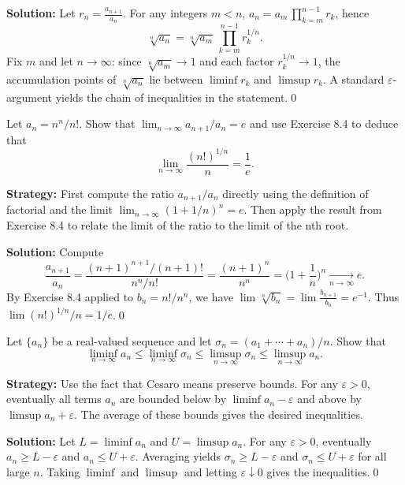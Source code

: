 \bigskip\noindent\textbf{Solution:}
Let \(r_n=\frac{a_{n+1}}{a_n}\). For any integers \(m<n\), \(a_n=a_m\,\prod_{k=m}^{n-1} r_k\), hence
\[\sqrt[n]{a_n}=\sqrt[n]{a_m}\, \prod_{k=m}^{n-1} r_k^{1/n}.\]
Fix \(m\) and let \(n\to\infty\): since \(\sqrt[n]{a_m}\to 1\) and each factor \(r_k^{1/n}\to 1\), the accumulation points of \(\sqrt[n]{a_n}\) lie between \(\liminf r_k\) and \(\limsup r_k\). A standard \(\varepsilon\)-argument yields the chain of inequalities in the statement.\qed


\begin{problembox}
\begin{problemstatement}
Let \(a_n = n^n / n!\). Show that \(\lim_{n \to \infty} a_{n+1} / a_n = e\) and use Exercise 8.4 to deduce that
\[\lim_{n \to \infty} \frac{(n!)^{1/n}}{n} = \frac{1}{e}.\]
\end{problemstatement}
\end{problembox}

\noindent\textbf{Strategy:} First compute the ratio \(a_{n+1}/a_n\) directly using the definition of factorial and the limit \(\lim_{n\to\infty}(1+1/n)^n=e\). Then apply the result from Exercise 8.4 to relate the limit of the ratio to the limit of the nth root.

\bigskip\noindent\textbf{Solution:}
Compute
\[\frac{a_{n+1}}{a_n}=\frac{(n+1)^{n+1}/(n+1)!}{n^n/n!}=\frac{(n+1)^n}{n^n}=\Big(1+\frac{1}{n}\Big)^n\xrightarrow[n\to\infty]{} e.\]
By Exercise 8.4 applied to \(b_n=n!/n^n\), we have \(\lim \sqrt[n]{b_n}=\lim \frac{b_{n+1}}{b_n}=e^{-1}\). Thus \(\lim (n!)^{1/n}/n=1/e\).\qed


\begin{problembox}
\begin{problemstatement}
Let \(\{a_n\}\) be a real-valued sequence and let \(\sigma_n = (a_1 + \cdots + a_n)/n\). Show that
\[\liminf_{n \to \infty} a_n \leq \liminf_{n \to \infty} \sigma_n \leq \limsup_{n \to \infty} \sigma_n \leq \limsup_{n \to \infty} a_n.\]
\end{problemstatement}
\end{problembox}

\noindent\textbf{Strategy:} Use the fact that Cesaro means preserve bounds. For any \(\varepsilon>0\), eventually all terms \(a_n\) are bounded below by \(\liminf a_n-\varepsilon\) and above by \(\limsup a_n+\varepsilon\). The average of these bounds gives the desired inequalities.

\bigskip\noindent\textbf{Solution:}
Let \(L=\liminf a_n\) and \(U=\limsup a_n\). For any \(\varepsilon>0\), eventually \(a_n\ge L-\varepsilon\) and \(a_n\le U+\varepsilon\). Averaging yields \(\sigma_n\ge L-\varepsilon\) and \(\sigma_n\le U+\varepsilon\) for all large \(n\). Taking \(\liminf\) and \(\limsup\) and letting \(\varepsilon\downarrow 0\) gives the inequalities.\qed


